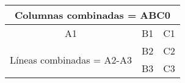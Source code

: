 \begin{tabular}{|c|c|c|}
\hline
	\multicolumn{3}{|c|}{Columnas combinadas = ABC0} \\
	\hline
	A1 & B1 & C1 \\
	\hline
	\multirow{2}{*}{Líneas combinadas = A2-A3}
	& B2 & C2 \\
	\cline{2-3}
	& B3 & C3 \\
\hline
\end{tabular}